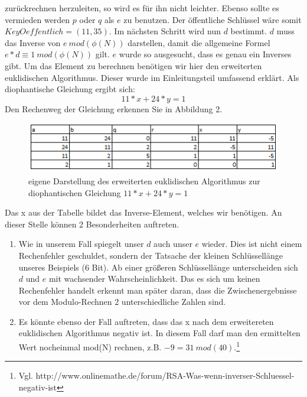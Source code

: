 zurückrechnen herzuleiten, so wird es für ihn nicht leichter. Ebenso sollte es
vermieden werden $p$ oder $q$ als $e$ zu benutzen.
\newline\newline
Der öffentliche Schlüssel wäre somit $KeyOeffentlich = (11, 35)$.
\newline\newline
Im nächsten Schritt wird nun $d$ bestimmt. $d$ muss das Inverse von $e \
mod(\phi(N))$ darstellen, damit die allgemeine Formel $e*d \equiv 1 \
mod(\phi(N))$ gilt.
$e$ wurde so ausgesucht, dass es genau ein Inverses gibt. Um das Element zu berechnen
benötigen wir hier den erweiterten euklidischen Algorithmus. Dieser wurde im
Einleitungsteil umfassend erklärt. Als diophantische Gleichung ergibt sich:
\begin{displaymath}
11*x + 24 * y = 1
\end{displaymath}
Den Rechenweg der Gleichung erkennen Sie in Abbildung 2.\newline
\begin{figure}[H]
\includegraphics[width=1\textwidth]{eEA.png}
\caption[erweiterter euklidischer Algorithmus (Beispiel)]{eigene Darstellung
des erweiterten euklidischen Algorithmus zur diophantischen Gleichung $11*x +
24*y = 1$}
\end{figure}
Das x aus der Tabelle bildet das Inverse-Element, welches wir benötigen. An
dieser Stelle können 2 Besonderheiten auftreten.
\begin{enumerate}
  \item Wie in unserem Fall spiegelt unser $d$ auch unser $e$ wieder. Dies ist
  nicht einem Rechenfehler geschuldet, sondern der Tatsache der kleinen
  Schlüssellänge unseres Beispiels (6 Bit). Ab einer größeren Schlüssellänge
  unterscheiden sich $d$ und $e$ mit wachsender Wahrscheinlichkeit. Das es sich
  um keinen Rechenfehler handelt erkennt man später daran, dass die
  Zwischenergebnisse vor dem Modulo-Rechnen 2 unterschiedliche Zahlen sind.
  \item Es könnte ebenso der Fall auftreten, dass das x nach dem
  erweitereten euklidischen Algorithmus negativ ist. In diesem Fall darf man 
  den ermittelten Wert nocheinmal mod(N) rechnen, z.B. $-9 = 31 \ mod
  (40)$.\footnote{Vgl.
  http://www.onlinemathe.de/forum/RSA-Was-wenn-inverser-Schluessel-negativ-ist}
\end{enumerate}
